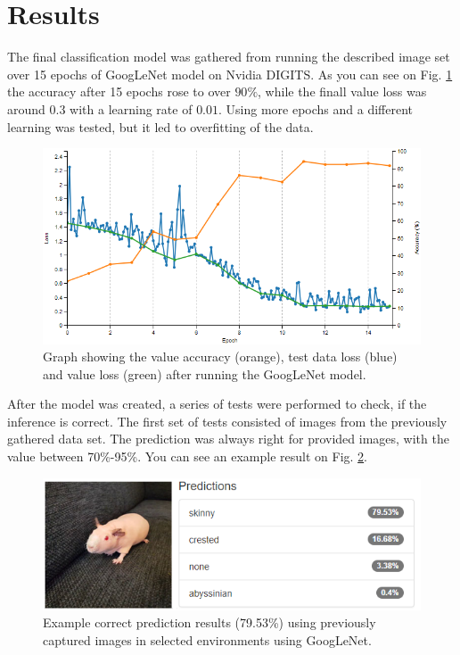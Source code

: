 \documentclass[10pt,journal,compsoc]{IEEEtran}
\begin{document}
    \section{Results}

    The final classification model was gathered from running the described image set over 15 epochs of GoogLeNet model on Nvidia DIGITS. As you can see on Fig. \ref{fig:googlenet} the accuracy after 15 epochs rose to over $90\%$, while the finall value loss was around $0.3$ with a learning rate of $0.01$. Using more epochs and a different learning was tested, but it led to overfitting of the data.

    \begin{figure}[h]
        \includegraphics[width=\linewidth]{googlenet.png}
        \caption{Graph showing the value accuracy (orange), test data loss (blue) and value loss (green) after running the GoogLeNet model.}
        \label{fig:googlenet}
        \centering
    \end{figure}

    After the model was created, a series of tests were performed to check, if the inference is correct. The first set of tests consisted of images from the previously gathered data set. The prediction was always right for provided images, with the value between 70\%-95\%. You can see an example result on Fig. \ref{fig:result_01}.
    
    \begin{figure}[h]
        \includegraphics[width=\linewidth]{result_01.png}
        \caption{Example correct prediction results (79.53\%) using previously captured images in selected environments using GoogLeNet.}
        \label{fig:result_01}
        \centering
    \end{figure}
\end{document}
